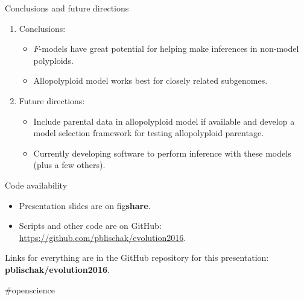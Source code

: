 \documentclass[presentation,sansserif,12pt]{beamer}
\begin{document}
\begin{frame}[t]{Conclusions and future directions}
	\pause
	\begin{enumerate}
		\item{Conclusions:}
		\vspace{0.1in}
		\setlength\itemsep{0.2in}
		\begin{itemize}
			\setlength\itemsep{0.2in}
			\item $F$-models have great potential for helping make inferences in non-model polyploids.
			\item Allopolyploid model works best for closely related subgenomes.
		\end{itemize}
		\pause
		\item{Future directions:}
		\vspace{0.1in}
		\setlength\itemsep{0.2in}
		\begin{itemize}
		\setlength\itemsep{0.2in}
			\item Include parental data in allopolyploid model if available and develop a model selection framework for testing allopolyploid parentage. \pause
			\item Currently developing software to perform inference with these models (plus a few others).
		\end{itemize}
	\end{enumerate}

\end{frame}

\begin{frame}[c]{Code availability}

	\begin{itemize}
	\setlength\itemsep{0.3in}

		\item Presentation slides are on fig\textbf{share}.
		
		\item Scripts and other code are on GitHub:\\[0.05in]\url{https://github.com/pblischak/evolution2016}.
		
		
	\end{itemize}
	\vspace{0.3in}

	{\large \alert{Links for everything are in the GitHub repository for this presentation: \textbf{pblischak/evolution2016}.}}
	\vspace{0.2in}

	\hfill {\tiny \#openscience}
\end{frame}
\end{document}
